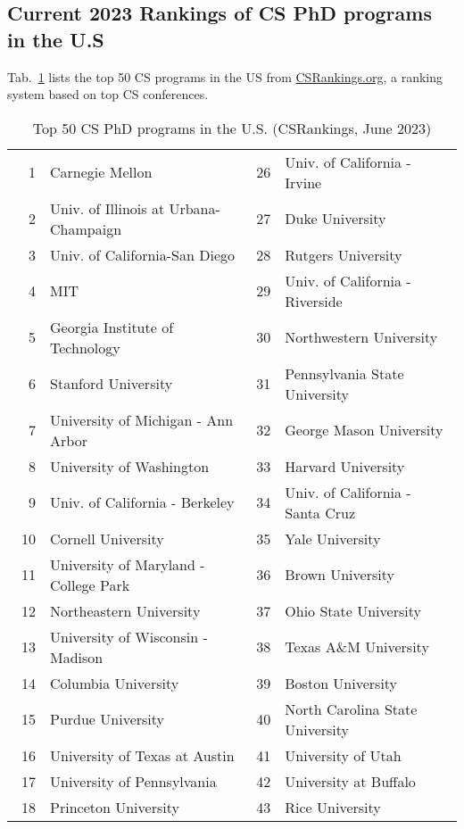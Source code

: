 \documentclass[11pt]{article}
\begin{document}
\subsection{Current 2023 Rankings of CS PhD programs in the U.S}\label{sec:ranking}
  Tab.~\ref{tab:ranking} lists the top 50 CS programs in the US from \href{https://www.csrankings.org}{CSRankings.org}, a ranking system  based on top CS conferences.
  
  \begin{table}[h!]
    \centering
    \small
    \caption{Top 50 CS PhD programs in the U.S. (CSRankings, June 2023)}\label{tab:ranking}
  \begin{tabular}{rl|rl}
    \toprule
    1 & Carnegie Mellon & 26 & Univ. of California - Irvine \\
    2 & Univ. of Illinois at Urbana-Champaign  & 27 &  Duke University \\
    3 & Univ. of California-San Diego & 28 & Rutgers University \\
    4 & MIT & 29 & Univ. of California - Riverside\\
    5 & Georgia Institute of Technology         & 30 & Northwestern University\\
    6 & Stanford University& 31 & Pennsylvania State University  \\
    7 & University of Michigan - Ann Arbor   & 32& George Mason University\\  
    8 & University of Washington      &33 &  Harvard University \\
    9 &  Univ. of California - Berkeley  &34&  Univ. of California - Santa Cruz \\
    10 & Cornell University  & 35 &  Yale University \\
    11 & University of Maryland - College Park &  36& Brown University \\ 
    12 & Northeastern University &37&  Ohio State University\\
    13 & University of Wisconsin - Madison  &38& Texas A\&M University \\
    14 & Columbia University   &39 & Boston University  \\
    15 &   Purdue University  &40& North Carolina State University\\\  
    16 & University of Texas at Austin   &41 & University of Utah \\
    17 & University of Pennsylvania &42 & University at Buffalo\\
    18 & Princeton University  & 43& Rice University\\

\end{tabular}
\end{table}
\end{document}
